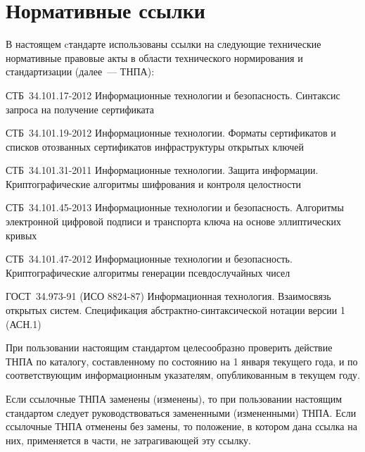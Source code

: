 \chapter{Нормативные ссылки}

В настоящем cтандарте использованы ссылки на следующие 
технические нормативные правовые акты в области 
технического нормирования и стандартизации (далее~--- ТНПА):

СТБ~34.101.17-2012 Информационные технологии и безопасность.
Синтаксис запроса на получение сертификата

СТБ~34.101.19-2012 Информационные технологии. 
Форматы сертификатов и списков отозванных сертификатов 
инфраструктуры открытых ключей

СТБ~34.101.31-2011 Информационные технологии. Защита информации.
Криптографические алгоритмы шифрования и контроля целостности

СТБ~34.101.45-2013 Информационные технологии и безопасность. 
Алгоритмы электронной цифровой подписи и транспорта ключа на основе
эллиптических кривых

СТБ~34.101.47-2012 Информационные технологии и безопасность. 
Криптографические алгоритмы генерации псевдослучайных чисел

ГОСТ~34.973-91 (ИСО 8824-87) Информационная технология. Взаимосвязь
открытых систем. Спецификация абстрактно-синтаксической нотации
версии 1 (АСН.1)

\begin{note*}
При пользовании настоящим стандартом целесообразно проверить действие ТНПА по
каталогу, составленному по состоянию на 1 января текущего года, и по
соответствующим информационным указателям, опубликованным в текущем году.

Если ссылочные ТНПА заменены (изменены), то при пользовании настоящим стандартом
следует руководствоваться замененными (измененными) ТНПА. Если ссылочные ТНПА
отменены без замены, то положение, в котором дана ссылка на них, применяется в
части, не затрагивающей эту ссылку.
\end{note*}
